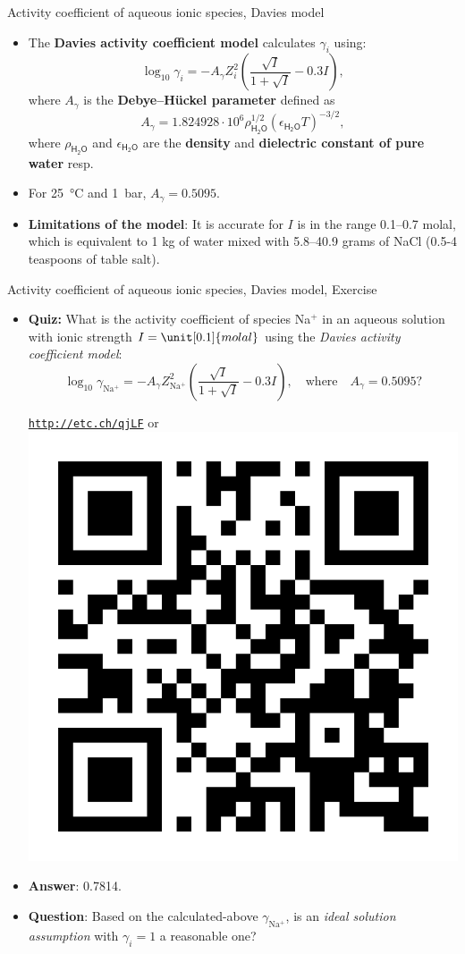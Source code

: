 \begin{frame}{Activity coefficient of aqueous ionic species, Davies model}
\begin{itemize}[<+->]
\item The \alert{\textbf{Davies activity coefficient model} } calculates $\gamma_{i}$
using:
\[
\boxed{\log_{10}\gamma_{i}=-A_{\gamma}Z_{i}^{2}\left(\dfrac{\sqrt{I}}{1+\sqrt{I}}-0.3I\right),}
\]
where $A_{\gamma}$ is the \textbf{Debye–Hückel parameter} defined as
\[
A_{\gamma}=1.824928\cdot10^{6}\rho_{\mathsf{H_{2}O}}^{1/2}(\epsilon_{\mathsf{H_{2}O}}T)^{-3/2},
\]
%
where $\rho_{\mathsf{H_{2}O}}$ and $\epsilon_{\mathsf{H_{2}O}}$
are the \textbf{density} and \textbf{dielectric constant of pure water} resp. 
\item For 25~°C and 1~bar, $A_{\gamma}=0.5095$.
\item \alert{\textbf{Limitations of the model}}: 
It is accurate for $I$ is in the range 0.1–0.7 molal, which is equivalent to 1 kg of water mixed with 5.8–40.9 grams of NaCl (0.5-4 teaspoons of table salt).
\end{itemize}
\end{frame}
%
%
\begin{frame}{Activity coefficient of aqueous ionic species, Davies model, Exercise}

\begin{itemize}
\item \alert{\textbf{Quiz:}} What is the activity coefficient of species Na$^{+}$ in an aqueous solution with ionic strength $I=\unit[0.1]{molal}$ using the \emph{Davies activity coefficient model}:
\[
\log_{10}\gamma_{\mathrm{Na^{+}}}=-A_{\gamma}Z_{\mathrm{Na^{+}}}^{2}\left(\dfrac{\sqrt{I}}{1+\sqrt{I}}-0.3I\right), \quad \mbox{where} \quad A_{\gamma}=0.5095?
\]
%
\begin{center}
\href{http://etc.ch/qjLF}{\textcolor{indigo(dye)}{\tt http://etc.ch/qjLF}} \quad or \quad 
\includegraphics[height=0.18\columnwidth]{figures/activity-models/poll-ionic-strength.png}
\end{center}
%
\vskip 10pt
\hiddenpause
\item \textbf{Answer}: 0.7814.
\pause
\item \textbf{Question}: Based on the calculated-above $\gamma_{\mathrm{Na^{+}}}$, is an \emph{ideal solution assumption} with $\gamma_{i}=1$ a reasonable one?
\end{itemize}
\end{frame}
